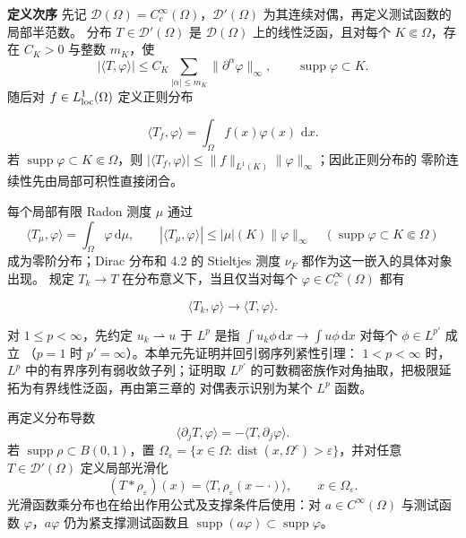 \documentclass[11pt,a4paper]{ctexart}
\newcommand{\eps}{\varepsilon}
\newcommand{\dd}{\,\mathrm d}
\newcommand{\supp}{\operatorname{supp}}
\newcommand{\dist}{\operatorname{dist}}
\newcommand{\weakto}{\rightharpoonup}
\newcommand{\planitem}[1]{\par\smallskip\noindent\textcolor{deepblue}{\textbf{#1}}\quad}
\begin{document}
\planitem{定义次序}
先记 $\mathcal D(\Omega)=C_c^\infty(\Omega)$，$\mathcal D'(\Omega)$ 为其连续对偶，再定义测试函数的局部半范数。
分布 $T\in\mathcal D'(\Omega)$ 是 $\mathcal D(\Omega)$ 上的线性泛函，且对每个 $K\Subset\Omega$，存在 $C_K>0$ 与整数 $m_K$，使
\[
|\langle T,\varphi\rangle|
\le C_K\sum_{|\alpha|\le m_K}\|\partial^\alpha\varphi\|_\infty,
\qquad \supp\varphi\subset K.
\]
随后对 $f\in L^1_{\rm loc}(\Omega)$ 定义正则分布

\[
\langle T_f,\varphi\rangle=\int_\Omega f(x)\varphi(x)\,\dd x.
\]
若 $\supp\varphi\subset K\Subset\Omega$，则
$|\langle T_f,\varphi\rangle|\le\|f\|_{L^1(K)}\|\varphi\|_\infty$；因此正则分布的
零阶连续性先由局部可积性直接闭合。

每个局部有限 Radon 测度 $\mu$ 通过
\[
\langle T_\mu,\varphi\rangle=\int_\Omega\varphi\dd\mu,
\qquad
|\langle T_\mu,\varphi\rangle|
\le |\mu|(K)\|\varphi\|_\infty
\quad(\supp\varphi\subset K\Subset\Omega)
\]
成为零阶分布；Dirac 分布和 4.2 的 Stieltjes 测度 $\nu_F$ 都作为这一嵌入的具体对象出现。
规定 $T_k\to T$ 在分布意义下，当且仅当对每个
$\varphi\in C_c^\infty(\Omega)$ 都有

\[
\langle T_k,\varphi\rangle\longrightarrow\langle T,\varphi\rangle.
\]

对 $1\le p<\infty$，先约定 $u_k\weakto u$ 于 $L^p$ 是指
$\int u_k\phi\dd x\to\int u\phi\dd x$ 对每个 $\phi\in L^{p'}$ 成立
（$p=1$ 时 $p'=\infty$）。本单元先证明并回引弱序列紧性引理：
$1<p<\infty$ 时，$L^p$ 中的有界序列有弱收敛子列；证明取
$L^{p'}$ 的可数稠密族作对角抽取，把极限延拓为有界线性泛函，再由第三章的
对偶表示识别为某个 $L^p$ 函数。

再定义分布导数
\[
\langle\partial_jT,\varphi\rangle=-\langle T,\partial_j\varphi\rangle.
\]
若 $\supp\rho\subset B(0,1)$，置
$\Omega_\eps=\{x\in\Omega:\dist(x,\Omega^c)>\eps\}$，并对任意
$T\in\mathcal D'(\Omega)$ 定义局部光滑化
\[
(T*\rho_\eps)(x)=\langle T,\rho_\eps(x-\cdot)\rangle,
\qquad x\in\Omega_\eps.
\]
光滑函数乘分布也在给出作用公式及支撑条件后使用：对 $a\in C^\infty(\Omega)$ 与测试函数
$\varphi$，$a\varphi$ 仍为紧支撑测试函数且
$\supp(a\varphi)\subset\supp\varphi$。
\end{document}
